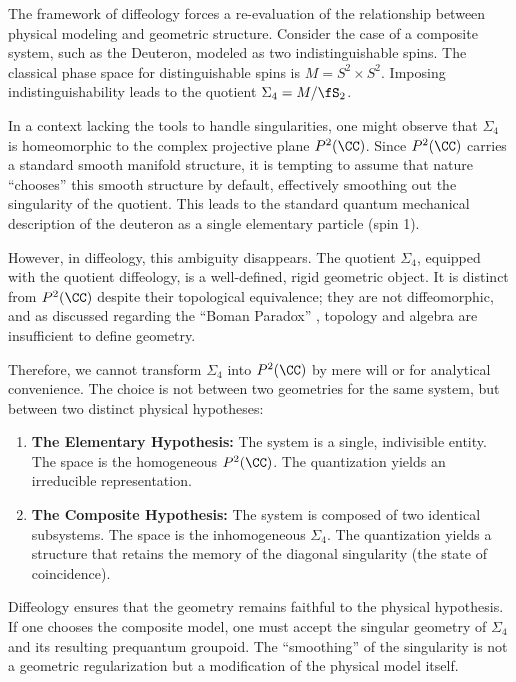   
  \begin{article}
    \label{art: The Physical Choice}
    
    The framework of diffeology forces a re-evaluation of the relationship between physical modeling and geometric structure.
    Consider the case of a composite system,
    such as the Deuteron,
    modeled as two indistinguishable spins.
    The classical phase space for distinguishable spins is $M = S^2 \times S^2$.
    Imposing indistinguishability leads to the quotient $\Sigma_4 = M / \fS_2$.
    
    In a context lacking the tools to handle singularities,
    one might observe that $\Sigma_4$ is homeomorphic to the complex projective plane $P^2(\CC)$.
    Since $P^2(\CC)$ carries a standard smooth manifold structure,
    it is tempting to assume that nature ``chooses'' this smooth structure by default,
    effectively smoothing out the singularity of the quotient.
    This leads to the standard quantum mechanical description of the deuteron as a single elementary particle (spin 1).
    
    However,
    in diffeology,
    this ambiguity disappears.
    The quotient $\Sigma_4$,
    equipped with the quotient diffeology,
    is a well-defined,
    rigid geometric object.
    It is distinct from $P^2(\CC)$ despite their topological equivalence;
    they are not diffeomorphic,
    and as discussed regarding the ``Boman Paradox'' \cite{PIZ25},
    topology and algebra are insufficient to define geometry.
    
    Therefore,
    we cannot transform $\Sigma_4$ into $P^2(\CC)$ by mere will or for analytical convenience.
    The choice is not between two geometries for the same system,
    but between two distinct physical hypotheses:
    \begin{enumerate}
      \item \textbf{The Elementary Hypothesis:} The system is a single,
      indivisible entity.
      The space is the homogeneous $P^2(\CC)$.
      The quantization yields an irreducible representation.
      \item \textbf{The Composite Hypothesis:} The system is composed of two identical subsystems.
      The space is the inhomogeneous $\Sigma_4$.
      The quantization yields a structure that retains the memory of the diagonal singularity (the state of coincidence).
    \end{enumerate}
    Diffeology ensures that the geometry remains faithful to the physical hypothesis.
    If one chooses the composite model,
    one must accept the singular geometry of $\Sigma_4$ and its resulting prequantum groupoid.
    The ``smoothing'' of the singularity is not a geometric regularization but a modification of the physical model itself.
  \end{article}
  
